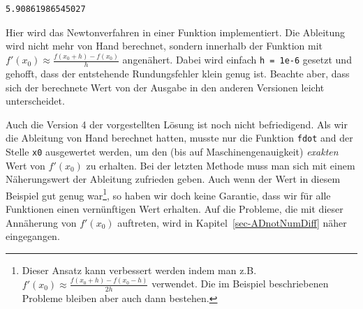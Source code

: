 \documentclass[
  letterpaper,
  DIV=11,
  oneside]{scrreprt}
\theoremstyle{definition}
\theoremstyle{definition}
\theoremstyle{remark}
\begin{document}
\begin{tcolorbox}
\begin{verbatim}
5.90861986545027
\end{verbatim}

Hier wird das Newtonverfahren in einer Funktion implementiert. Die
Ableitung wird nicht mehr von Hand berechnet, sondern innerhalb der
Funktion mit \(f'(x_0)\approx \frac{f(x_0 + h) - f(x_0)}{h}\)
angenähert. Dabei wird einfach \texttt{h\ =\ 1e-6} gesetzt und gehofft,
dass der entstehende Rundungsfehler klein genug ist. Beachte aber, dass
sich der berechnete Wert von der Ausgabe in den anderen Versionen leicht
unterscheidet.

\end{tcolorbox}

Auch die Version 4 der vorgestellten Lösung ist noch nicht befriedigend.
Als wir die Ableitung von Hand berechnet hatten, musste nur die Funktion
\texttt{fdot} and der Stelle \texttt{x0} ausgewertet werden, um den (bis
auf Maschinengenauigkeit) \emph{exakten} Wert von \(f'(x_0)\) zu
erhalten. Bei der letzten Methode muss man sich mit einem Näherungswert
der Ableitung zufrieden geben. Auch wenn der Wert in diesem Beispiel gut
genug war\footnote{Dieser Ansatz kann verbessert werden indem man z.B.
  \(f'(x_0) \approx \frac{f(x_0 + h) - f(x_0 - h)}{2h}\) verwendet. Die
  im Beispiel beschriebenen Probleme bleiben aber auch dann bestehen.},
so haben wir doch keine Garantie, dass wir für alle Funktionen einen
vernünftigen Wert erhalten. Auf die Probleme, die mit dieser Annäherung
von \(f'(x_0)\) auftreten, wird in Kapitel~\ref{sec-ADnotNumDiff} näher
eingegangen.
\end{document}
